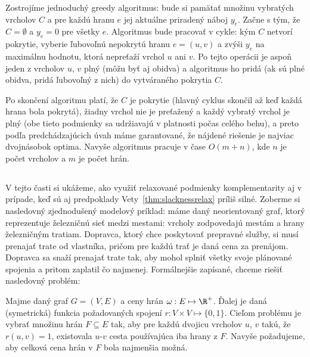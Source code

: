 \noindent
Zostrojíme jednoduchý greedy algoritmus: bude si pamätať množinu vybratých vrcholov $C$ a pre každú hranu 
$e$ jej aktuálne priradený náboj $y_e$. Začne s tým, že $C=\emptyset$ a $y_e=0$ pre všetky $e$. Algoritmus bude 
pracovať v cykle: kým $C$ netvorí pokrytie, vyberie ľubovoľnú nepokrytú hranu $e=(u,v)$ a zvýši $y_e$ na maximálnu
hodnotu, ktorá nepreťaží vrchol $u$ ani $v$. Po tejto operácii je aspoň jeden z vrcholov $u$, $v$ plný (môžu
byť aj obidva) a algoritmus ho pridá (ak sú plné obidva, pridá ľubovoľný z nich) do vytváraného pokrytia $C$.

\noindent
Po skončení algoritmu platí, že $C$ je pokrytie (hlavný cyklus skončil až keď každá hrana bola pokrytá),
žiadny vrchol nie je preťažený a každý vybratý vrchol je plný (obe tieto podmienky sa udržiavajú v platnosti
počas celého behu), a preto podľa predchádzajúcich úvah máme garantované, že nájdené riešenie je najviac
dvojnásobok optima. Navyše algoritmus pracuje v čase $O(m+n)$, kde $n$ je počet vrcholov a $m$ je počet hrán.


\subsection*{\minsforest}

\noindent
V tejto časti si ukážeme, ako využiť relaxované podmienky komplementarity aj v prípade, keď sú aj
predpoklady Vety~\ref{thm:slacknessrelax} príliš silné. Zoberme si nasledovný zjednodušený modelový príklad:
máme daný neorientovaný graf, ktorý reprezentuje železničnú sieť medzi mestami: vrcholy zodpovedajú mestám a hrany
železničným tratiam. Dopravca, ktorý chce poskytovať prepravné služby, si musí 
prenajať trate od vlastníka, pričom pre každú trať je daná cena za prenájom. Dopravca sa snaží prenajať
trate tak, aby mohol splniť všetky svoje plánované spojenia a pritom zaplatil čo najmenej. Formálnejšie
zapísané, chceme riešiť nasledovný problém:

\begin{framed}
  \begin{dfn}
    Majme daný graf $G=(V,E)$ a ceny hrán $\omega:E\mapsto\R^+$. Ďalej je daná (symetrická) 
    funkcia požadovaných spojení
    $r:V\times V\mapsto\{0,1\}$. Cieľom problému \minsforest je vybrať množinu hrán $F\subseteq E$ tak, 
    aby pre každú dvojicu vrcholov $u$, $v$ takú, že $r(u,v)=1$, existovala $u$-$v$ cesta používajúca iba hrany z 
    $F$. Navyše požadujeme, aby celková cena hrán v $F$ bola najmenšia možná.
  \end{dfn}
\end{framed}


